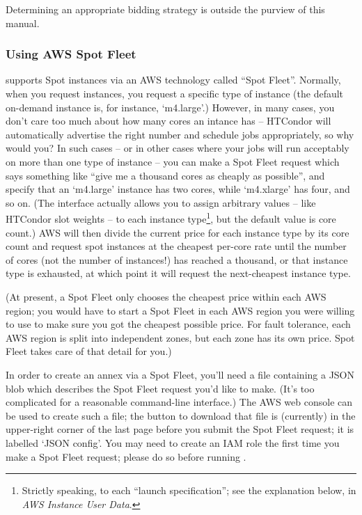 Determining an appropriate bidding strategy is outside the purview of
this manual.

\subsubsection{Using AWS Spot Fleet}

 supports Spot instances via an AWS technology called
``Spot Fleet''.  Normally, when you request instances, you request a specific
type of instance (the default on-demand instance is, for instance, `m4.large'.)
However, in many cases, you don't care too much about how many cores an
intance has -- HTCondor will automatically advertise the right number and
schedule jobs appropriately, so why would you?  In such cases -- or in
other cases where your jobs will run acceptably on more than one type of
instance -- you can make a Spot Fleet request which says something like
``give me a thousand cores as cheaply as possible'', and specify that
an `m4.large' instance has two cores, while `m4.xlarge' has four, and so
on.  (The interface actually allows you to assign arbitrary values --
like HTCondor slot weights -- to each instance
type\footnote{Strictly speaking, to each ``launch specification''; see
the explanation below, in \emph{AWS Instance User Data}.},
but the default value is core count.)  AWS will then divide the current price for each
instance type by its core count and request spot instances at the cheapest
per-core rate until the number of cores (not the number of instances!) has
reached a thousand, or that instance type is exhausted, at which point it will
request the next-cheapest instance type.

(At present, a Spot Fleet only chooses the cheapest price within each
AWS region; you would have to start a Spot Fleet in each AWS region you
were willing to use to make sure you got the cheapest possible price.  For
fault tolerance, each AWS region is split into independent zones, but each
zone has its own price.  Spot Fleet takes care of that detail for you.)

In order to create an annex via a Spot Fleet, you'll need a file containing
a JSON blob which describes the Spot Fleet request you'd like to make.  (It's
too complicated for a reasonable command-line interface.)  The AWS web
console can be used to create such a file; the button to download that
file is (currently) in the upper-right corner of the last page before
you submit the Spot Fleet request; it is labelled `JSON config'.  You
may need to create an IAM role the first time you make a Spot Fleet
request; please do so before running .

